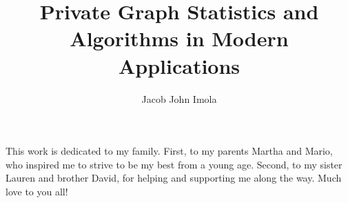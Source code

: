 \documentclass[12pt]{ucsddissertation}
\title{Private Graph Statistics and Algorithms in Modern Applications}
\author{Jacob John Imola}
\begin{document}
\frontmatter
\maketitle
\makecopyright
\makesignature
\begin{dedication}
\setsinglespacing
\raggedright %
\parindent0pt\parskip\baselineskip
This work is dedicated to my family. First, to my parents Martha and Mario,
who inspired me to strive to be my best from a young age. Second, to my
sister Lauren and brother David, for helping and supporting me along the way. 
Much love to you all!
\end{dedication}
\tableofcontents
\listoffigures
\listoftables
\end{document}

